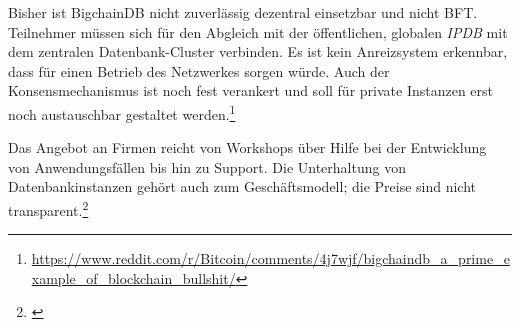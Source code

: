 Bisher ist BigchainDB nicht zuverlässig dezentral einsetzbar und nicht \gls{BFT}.
Teilnehmer müssen sich für den Abgleich mit der öffentlichen, globalen \emph{IPDB} mit dem zentralen Datenbank-Cluster verbinden.
Es ist kein Anreizsystem erkennbar, dass für einen Betrieb des Netzwerkes sorgen würde.
Auch der Konsensmechanismus ist noch fest verankert und soll für private Instanzen erst noch austauschbar gestaltet werden.\footnote{\url{https://www.reddit.com/r/Bitcoin/comments/4j7wjf/bigchaindb_a_prime_example_of_blockchain_bullshit/}}

Das Angebot an Firmen reicht von Workshops über Hilfe bei der Entwicklung von Anwendungsfällen bis hin zu Support.
Die Unterhaltung von Datenbankinstanzen gehört auch zum Geschäftsmodell; die Preise sind nicht transparent.\footnote{\cite{w:bigchaindb-enterprise}}




